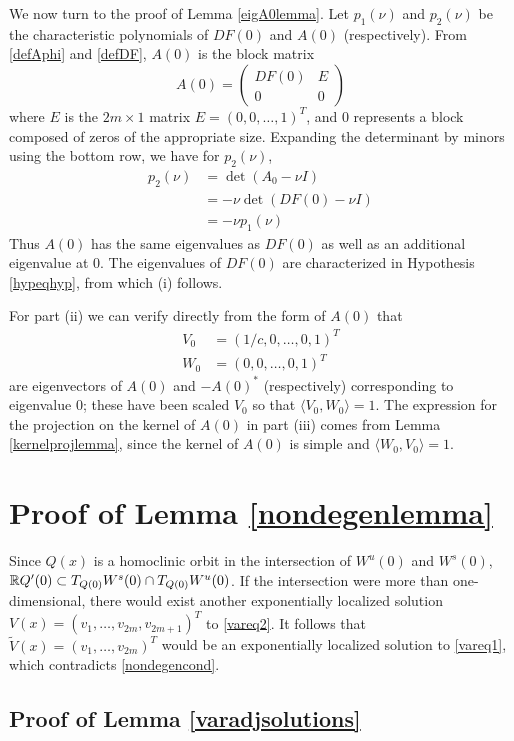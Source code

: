 \documentclass[thesis.tex]{subfiles}
\begin{document}
We now turn to the proof of Lemma \ref{eigA0lemma}. Let $p_1(\nu)$ and $p_2(\nu)$ be the characteristic polynomials of $DF(0)$ and $A(0)$ (respectively). From \eqref{defAphi} and \eqref{defDF}, $A(0)$ is the block matrix
\[
A(0) = \begin{pmatrix}
DF(0) & E \\
0 & 0
\end{pmatrix}
\]
where $E$ is the $2m \times 1$ matrix $E = (0, 0, \dots, 1)^T$, and $0$ represents a block composed of zeros of the appropriate size. Expanding the determinant by minors using the bottom row, we have for $p_2(\nu)$,
\begin{align*}
p_2(\nu) &= \det(A_0 - \nu I) \\
&= -\nu \det(DF(0) - \nu I) \\
&= -\nu p_1(\nu)
\end{align*}
Thus $A(0)$ has the same eigenvalues as $DF(0)$ as well as an additional eigenvalue at 0. The eigenvalues of $DF(0)$ are characterized in Hypothesis \ref{hypeqhyp}, from which (i) follows.

For part (ii) we can verify directly from the form of $A(0)$ that 
\begin{align*}
V_0 &= (1/c, 0, \dots, 0, 1)^T \\
W_0 &= (0, 0, \dots, 0, 1)^T
\end{align*}
are eigenvectors of $A(0)$ and $-A(0)^*$ (respectively) corresponding to eigenvalue 0; these have been scaled $V_0$ so that $\langle V_0, W_0 \rangle = 1$. The expression for the projection on the kernel of $A(0)$ in part (iii) comes from Lemma \ref{kernelprojlemma}, since the kernel of $A(0)$ is simple and $\langle W_0, V_0 \rangle = 1$.

\section{Proof of Lemma \ref{nondegenlemma}}
Since $Q(x)$ is a homoclinic orbit in the intersection of $W^u(0)$ and $W^s(0)$, $\mathbb{R} Q'(0) \subset T_{Q(0)}W^s(0) \cap T_{Q(0)}W^u(0)$. If the intersection were more than one-dimensional, there would exist another exponentially localized solution $V(x) = (v_1, \dots, v_{2m}, v_{2m+1})^T$ to \eqref{vareq2}. It follows that $\tilde{V}(x) = (v_1, \dots, v_{2m})^T$ would be an exponentially localized solution to \eqref{vareq1}, which contradicts \eqref{nondegencond}.

\subsection{Proof of Lemma \ref{varadjsolutions}}
\end{document}
